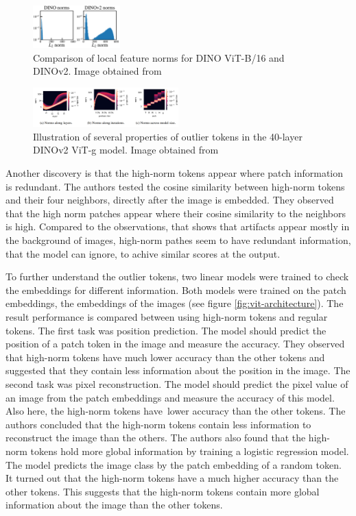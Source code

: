 \documentclass[conference]{IEEEtran}
\begin{document}
  \begin{figure}
    \centering
    \includegraphics[width=0.3\textwidth]{figures/artifact-norm.png}
    \caption{Comparison of local feature norms for \mbox{DINO} ViT-B/16 and \mbox{DINOv2}. Image obtained from \cite{registers}}
    \label{fig:artifacts-norm}
  \end{figure}
  \begin{figure}
    \centering
    \includegraphics[width=0.5\textwidth]{figures/artifact-layers.png}
    \caption{Illustration of several properties of outlier tokens in the 40-layer \mbox{DINOv2} ViT-g model. Image obtained from \cite{registers}}
    \label{fig:artifacts-layer}
  \end{figure}

  Another discovery is that the high-norm tokens appear where patch information is redundant. The authors tested the cosine similarity between high-norm tokens and their four neighbors, directly after the image is embedded. They observed that the high norm patches appear where their cosine similarity to the neighbors is high. Compared to the observations, that shows that artifacts appear mostly in the background of images, high-norm pathes seem to have redundant information, that the model can ignore, to achive similar scores at the output.

  To further understand the outlier tokens, two linear models were trained to check the embeddings for different information. Both models were trained on the patch embeddings, the embeddings of the images (see figure \ref{fig:vit-architecture}). The result performance is compared between using high-norm tokens and regular tokens. The first task was position prediction. The model should predict the position of a patch token in the image and measure the accuracy. They observed that high-norm tokens have much lower accuracy than the other tokens and suggested that they contain less information about the position in the image. The second task was pixel reconstruction. The model should predict the pixel value of an image from the patch embeddings and measure the accuracy of this model. Also here, the high-norm tokens have lower accuracy than the other tokens. The authors concluded that the high-norm tokens contain less information to reconstruct the image than the others. The authors also found that the high-norm tokens hold more global information by training a logistic regression model. The model predicts the image class by the patch embedding of a random token. It turned out that the high-norm tokens have a much higher accuracy than the other tokens. This suggests that the high-norm tokens contain more global information about the image than the other tokens. 
\end{document}

